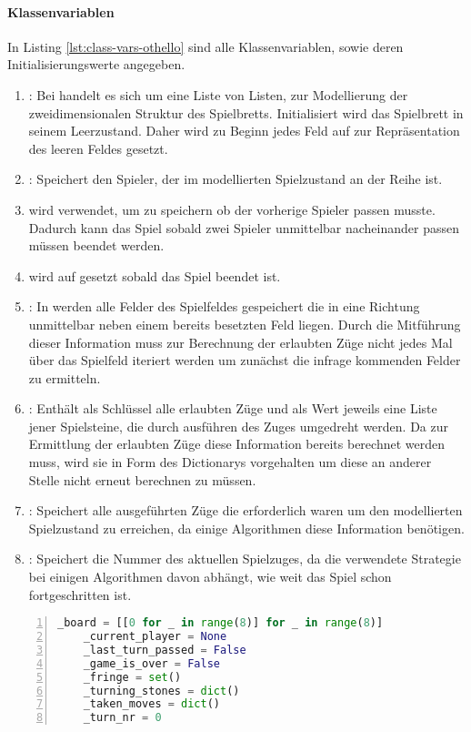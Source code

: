 \paragraph{Klassenvariablen}
In Listing \ref{lst:class-vars-othello} sind alle Klassenvariablen, sowie deren Initialisierungswerte angegeben.
\begin{enumerate}
\item {}: Bei  handelt es sich um eine Liste von Listen, zur Modellierung der zweidimensionalen Struktur des Spielbretts. Initialisiert wird das Spielbrett in seinem Leerzustand. Daher wird zu Beginn jedes Feld auf  zur Repräsentation des leeren Feldes gesetzt.
\item {}: Speichert den Spieler, der im modellierten Spielzustand an der Reihe ist.
\item {} wird verwendet, um zu speichern ob der vorherige Spieler  passen musste. Dadurch kann das Spiel sobald zwei Spieler unmittelbar nacheinander passen müssen beendet werden.
\item {} wird auf  gesetzt sobald das Spiel beendet ist.
\item {}: In  werden alle Felder des Spielfeldes gespeichert die in eine Richtung unmittelbar neben einem bereits besetzten Feld liegen. Durch die Mitführung dieser Information muss zur Berechnung der erlaubten Züge nicht jedes Mal über das Spielfeld iteriert werden um zunächst die infrage kommenden Felder zu ermitteln.
\item {}: Enthält als Schlüssel alle erlaubten Züge und als Wert jeweils eine Liste jener Spielsteine, die durch ausführen des Zuges umgedreht werden. Da zur Ermittlung der erlaubten Züge diese Information bereits berechnet werden muss, wird sie in Form des Dictionarys vorgehalten um diese an anderer Stelle nicht erneut berechnen zu müssen.
\item {}: Speichert alle ausgeführten Züge die erforderlich waren um den modellierten Spielzustand zu erreichen, da einige Algorithmen diese Information benötigen.
\item {}: Speichert die Nummer des aktuellen Spielzuges, da die verwendete Strategie bei einigen Algorithmen davon abhängt, wie weit das Spiel schon fortgeschritten ist.
\end{enumerate}
\newpage
\begin{lstlisting}[basicstyle=\footnotesize, caption = {Klassenvariablen der Klasse \mxZitat{Othello}}, language = python, captionpos = t , numbers=left, label={lst:class-vars-othello}]
    _board = [[0 for _ in range(8)] for _ in range(8)]
    _current_player = None 
    _last_turn_passed = False
    _game_is_over = False
    _fringe = set()
    _turning_stones = dict()    
    _taken_moves = dict()
    _turn_nr = 0
\end{lstlisting}

